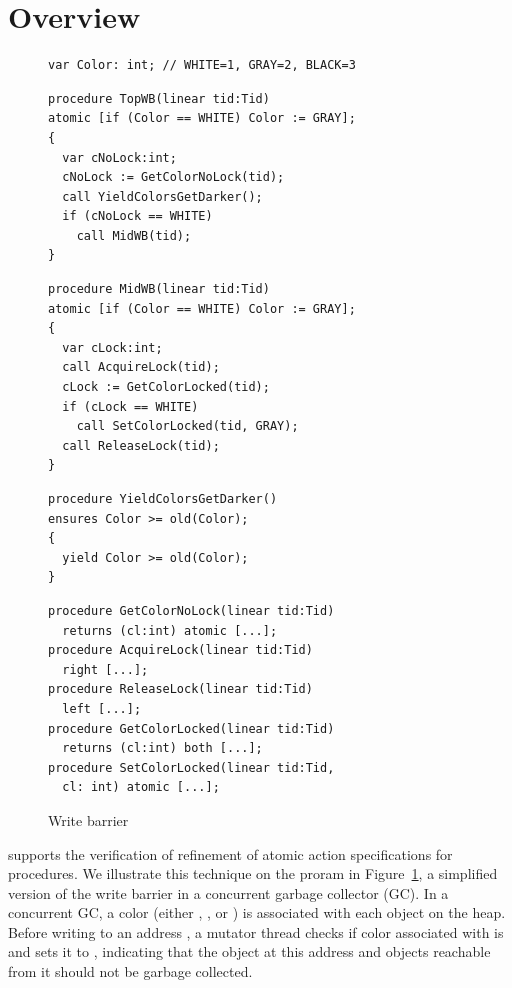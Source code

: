 \section{Overview}
\label{sec:overview}

\begin{figure}
\begin{verbatim}
var Color: int; // WHITE=1, GRAY=2, BLACK=3
\end{verbatim}
\begin{verbatim}
procedure TopWB(linear tid:Tid)
atomic [if (Color == WHITE) Color := GRAY];
{
  var cNoLock:int;
  cNoLock := GetColorNoLock(tid);
  call YieldColorsGetDarker(); 
  if (cNoLock == WHITE) 
    call MidWB(tid);
}
\end{verbatim}
\begin{verbatim}
procedure MidWB(linear tid:Tid)
atomic [if (Color == WHITE) Color := GRAY];
{
  var cLock:int;
  call AcquireLock(tid);
  cLock := GetColorLocked(tid);
  if (cLock == WHITE) 
    call SetColorLocked(tid, GRAY);
  call ReleaseLock(tid);
}
\end{verbatim}
\begin{verbatim}
procedure YieldColorsGetDarker()
ensures Color >= old(Color);
{
  yield Color >= old(Color);
}
\end{verbatim}
\begin{verbatim}
procedure GetColorNoLock(linear tid:Tid) 
  returns (cl:int) atomic [...];
procedure AcquireLock(linear tid:Tid) 
  right [...];
procedure ReleaseLock(linear tid:Tid) 
  left [...];
procedure GetColorLocked(linear tid:Tid) 
  returns (cl:int) both [...];
procedure SetColorLocked(linear tid:Tid, 
  cl: int) atomic [...];
\end{verbatim}
\caption{Write barrier}
\label{fig:reft}
\end{figure}

\civl supports the verification of refinement of atomic action specifications for procedures. 
We illustrate this technique on the proram in Figure~\ref{fig:reft},
a simplified version of the write barrier in a concurrent garbage collector (GC).
In a concurrent GC, a color (either , , or )
is associated with each object on the heap.  
Before writing to an address , a mutator thread checks 
if color associated with  is 
and sets it to , indicating that the object at this address
and objects reachable from it should not be garbage collected. 

